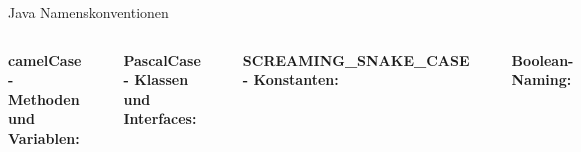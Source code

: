 \begin{frame}[fragile]{Java Namenskonventionen}
  \begin{columns}[T]
    \textbf{camelCase - Methoden und Variablen:}
    \begin{lstlisting}[style=java, basicstyle=\tiny\ttfamily]
// Methoden: Verben
public void calculateInterest()
public String getUserName()
public boolean isValid()
public void setCustomerAddress()

// Variablen: Nomen
String firstName;
int customerAge;
List<Order> pendingOrders;
boolean isReadyForProcessing;
    \end{lstlisting}

    \textbf{PascalCase - Klassen und Interfaces:}
    \begin{lstlisting}[style=java, basicstyle=\tiny\ttfamily]
// Klassen: Nomen
public class CustomerManager
public class OrderProcessor
public class PaymentGateway

// Interfaces: oft Adjektive mit -able
public interface Serializable
public interface Comparable<T>
public interface Runnable
    \end{lstlisting}

    \textbf{SCREAMING\_SNAKE\_CASE - Konstanten:}
    \begin{lstlisting}[style=java, basicstyle=\tiny\ttfamily]
public static final int MAX_RETRY_COUNT = 3;
public static final String DEFAULT_ENCODING = "UTF-8";
public static final double PI = 3.14159;

// Enums
public enum Status {
    PENDING,
    IN_PROGRESS,
    COMPLETED,
    CANCELLED
}
    \end{lstlisting}

    \textbf{Boolean-Naming:}
    \begin{lstlisting}[style=java, basicstyle=\tiny\ttfamily]
// Präfixe: is, has, can, should
boolean isValid;
boolean hasPermission;
boolean canEdit;
boolean shouldRetry;

// Methoden genauso
public boolean isEmpty()
public boolean hasNext()
public boolean canAccess()
    \end{lstlisting}
  \end{columns}
\end{frame}

